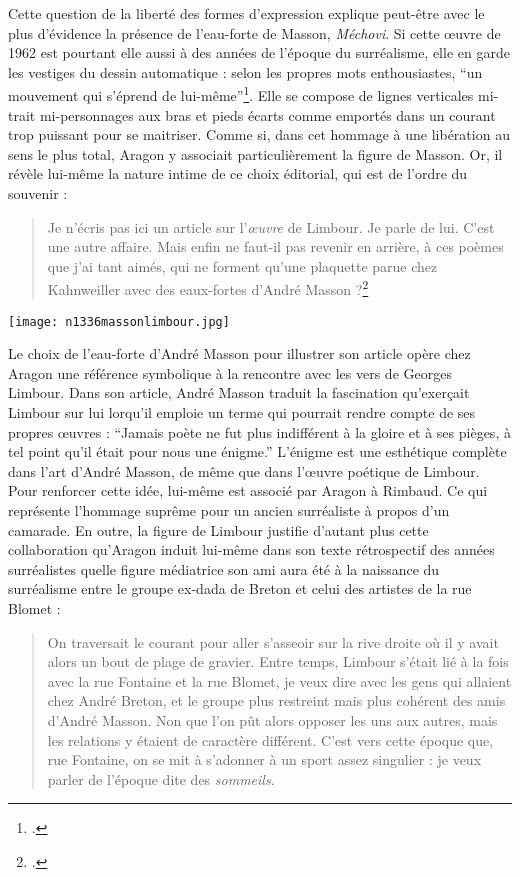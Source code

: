 	Cette question de la liberté des formes d’expression explique peut-être avec le plus d’évidence la présence de l’eau-forte de Masson, \emph{Méchovi}. Si cette \oe{}uvre de 1962 est pourtant elle aussi à des années de l’époque du surréalisme, elle en garde les vestiges du dessin automatique : selon les propres mots enthousiastes, \enquote{un mouvement qui s’éprend de lui-même}\footcite[p21]{rebelle}. Elle se compose de lignes verticales mi-trait mi-personnages aux bras et pieds écarts comme emportés dans un courant trop puissant pour se maitriser. Comme si, dans cet hommage à une libération au sens le plus total, Aragon y associait particulièrement la figure de Masson. Or, il révèle lui-même la nature intime de ce choix éditorial, qui est de l’ordre du souvenir :
\begin{quote}
Je n’écris pas ici un article sur l’\emph{\oe{}uvre} de Limbour. Je parle de lui. C’est une autre affaire. Mais enfin ne faut-il pas revenir en arrière, à ces poèmes que j’ai tant aimés, qui ne forment qu’une plaquette parue chez Kahnweiller avec des eaux-fortes d’André Masson ?\footcite{journallimbour}\end{quote}

\begin{figure*}[htp]
   \centering
   \texttt{[image: n1336massonlimbour.jpg]}
	\caption{\cite{journallimbour}}\label{fig:Méchovi}
\end{figure*}

	Le choix de l’eau-forte d’André Masson pour illustrer son article opère chez Aragon une référence symbolique à la rencontre avec les vers de Georges Limbour. Dans son article, André Masson traduit la fascination qu’exerçait Limbour sur lui lorqu'il emploie un terme qui pourrait rendre compte de ses propres œuvres : \enquote{Jamais poète ne fut plus indifférent à la gloire et à ses pièges, à tel point qu’il était pour nous une énigme.} L’énigme est une esthétique complète dans l’art d’André Masson, de même que dans l’\oe{}uvre poétique de Limbour. Pour renforcer cette idée, lui-même est associé par Aragon à Rimbaud. Ce qui représente l'hommage suprême pour un ancien surréaliste à propos d’un camarade. En outre, la figure de Limbour justifie d’autant plus cette collaboration qu’Aragon induit lui-même dans son texte rétrospectif des années surréalistes quelle figure médiatrice son ami aura été à la naissance du surréalisme entre le groupe ex-dada de Breton et celui des artistes de la rue Blomet : 

\begin{quote}
On traversait le courant pour aller s’asseoir sur la rive droite où il y avait alors un bout de plage de gravier. Entre temps, Limbour s’était lié à la fois avec la rue Fontaine et la rue Blomet, je veux dire avec les gens qui allaient chez André Breton, et le groupe plus restreint mais plus cohérent des amis d’André Masson. Non que l’on pût alors opposer les uns aux autres, mais les relations y étaient de caractère différent. C’est vers cette époque que, rue Fontaine, on se mit à s’adonner à un sport assez singulier : je veux parler de l’époque dite des \emph{sommeils}.	
\end{quote}



